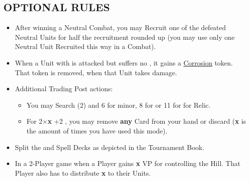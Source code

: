 \begin{multicols}{2}
\subsection*{\MakeUppercase{Optional Rules}}
\begin{itemize}
  \item After winning a Neutral Combat, you may Recruit one of the defeated Neutral Units for half the recruitment  rounded up (you may use only one Neutral Unit Recruited this way in a Combat).  %
  \item When a Unit with  is attacked but suffers no , it gains a \href{https://archon-studio.com/files/manuals/homm/HoMM-Stronghold-Mission-Book-Beta_EN.pdf}{Corrosion} token. That token is removed, when that Unit takes damage.
  \item Additional Trading Post actions:
  \begin{itemize}
    \item You may Search (2)  and  6  for minor, 8 for  or 11 for  for Relic.
    \item For 2×\textbf{x} +2  , you may remove \textbf{any} Card from your hand or discard (\textbf{x} is the amount of times you have used this mode).
  \end{itemize}
  \item Split the  and Spell Decks as depicted in the Tournament Book.
  \item In a 2-Player game when a Player gains \textbf{x} VP for controlling the Hill. That Player also has to distribute \textbf{x}  to their Units.
\end{itemize}

\end{multicols}

